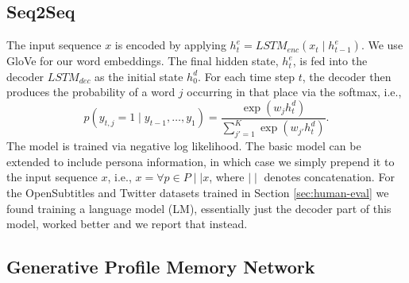 %

\subsection{Seq2Seq}

The input sequence $x$ is encoded by applying $h^e_t = LSTM_{enc}(x_t \mid h^e_{t-1})$. We use GloVe \citep{pennington2014glove} for our word embeddings. The final hidden state, $h^e_t$, is fed into the decoder $LSTM_{dec}$ as the initial state $h^d_0$. For each time step $t$, the decoder then produces the probability of a word $j$ occurring in that place via the softmax, i.e.,
\begin{equation*}
p(y_{t,j} = 1 \mid y_{t-1}, \ldots, y_1) = \frac{\exp (w_j h^d_t)}{\sum^K_{j'=1} \exp (w_{j'} h^d_t)}.
\end{equation*}
The model is trained via negative log likelihood. The basic model can be extended to include persona information, in which case we simply prepend it to the input sequence $x$, i.e., $x =  \forall p \in P \mid\mid x$, where $\mid\mid$ denotes concatenation.
For the OpenSubtitles and Twitter datasets trained in Section \ref{sec:human-eval} we found training a language model (LM), essentially just the decoder part of this model, worked better and we report that instead.


\subsection{Generative Profile Memory Network}

